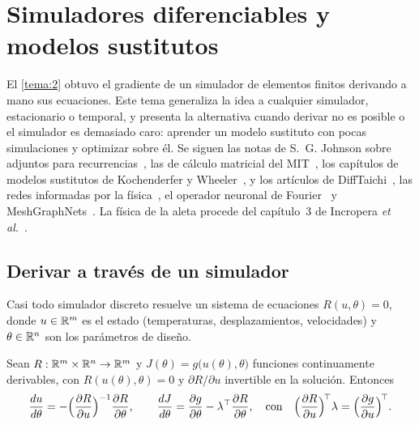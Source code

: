 \chapter{Simuladores diferenciables y modelos sustitutos}
\label{tema:3}

El \cref{tema:2} obtuvo el gradiente de un simulador de elementos finitos derivando a mano sus ecuaciones. Este tema generaliza la idea a cualquier simulador, estacionario o temporal, y presenta la alternativa cuando derivar no es posible o el simulador es demasiado caro: aprender un modelo sustituto con pocas simulaciones y optimizar sobre él. Se siguen las notas de S.~G. Johnson sobre adjuntos para recurrencias~\cite{johnson}, las de cálculo matricial del MIT~\cite[§6.3]{mit18s096}, los capítulos de modelos sustitutos de Kochenderfer y Wheeler~\cite{kw}, y los artículos de DiffTaichi~\cite{difftaichi}, las redes informadas por la física~\cite{pinn}, el operador neuronal de Fourier~\cite{fno} y MeshGraphNets~\cite{mgn}. La física de la aleta procede del capítulo~3 de Incropera \emph{et al.}~\cite{incropera}.

\section{Derivar a través de un simulador}

Casi todo simulador discreto resuelve un sistema de ecuaciones $R(u,\theta)=0$, donde $u\in\mathbb{R}^m$ es el estado (temperaturas, desplazamientos, velocidades) y $\theta\in\mathbb{R}^n$ son los parámetros de diseño.

\begin{teorema}\label{teo:implicita}
Sean $R:\mathbb{R}^m\times\mathbb{R}^n\to\mathbb{R}^m$ y $J(\theta)=g\bigl(u(\theta),\theta\bigr)$ funciones continuamente derivables, con $R(u(\theta),\theta)=0$ y $\partial R/\partial u$ invertible en la solución. Entonces
\[
\frac{du}{d\theta}=-\Bigl(\frac{\partial R}{\partial u}\Bigr)^{-1}\frac{\partial R}{\partial\theta},\qquad
\frac{dJ}{d\theta}=\frac{\partial g}{\partial\theta}-\lambda^\top\frac{\partial R}{\partial\theta},\quad\text{con}\quad\Bigl(\frac{\partial R}{\partial u}\Bigr)^{\!\top}\lambda=\Bigl(\frac{\partial g}{\partial u}\Bigr)^{\!\top}.
\]
\end{teorema}

